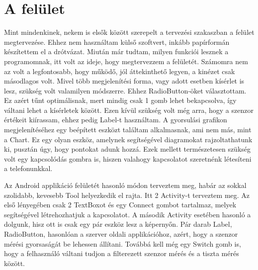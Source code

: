 \documentclass{thesis-ekf}
\theoremstyle{definition}
\theoremstyle{remark}
\begin{document}
\section{A felület}
Mint mindenkinek, nekem is elsők között szerepelt a tervezési szakaszban a felület megtervezése. Ehhez nem használtam külső szoftvert, inkább papírformán készítettem el a drótvázat. Miután már tudtam, milyen funkciói lesznek a programomnak, itt volt az ideje, hogy megtervezzem a felületét. Számomra nem az volt a legfontosabb, hogy működő, jól áttekinthető legyen, a kinézet csak másodlagos volt. Mivel több megjelenítési forma, vagy adott esetben kísérlet is lesz, szükség volt valamilyen módszerre. Ehhez RadioButton-öket választottam. Ez azért tűnt optimálisnak, mert mindig csak 1 gomb lehet bekapcsolva, így váltani lehet a kísérletek között. Ezen kívül szükség volt még arra, hogy a szenzor értékeit kiírassam, ehhez pedig Label-t használtam. A gyorsulási grafikon megjelenítéséhez egy beépített eszközt találtam alkalmasnak, ami nem más, mint a Chart. Ez egy olyan eszköz, amelynek segítségével diagramokat rajzoltathatunk ki, pusztán úgy, hogy pontokat adunk hozzá.
Ezek mellett természetesen szükség volt egy kapcsolódás gombra is, hiszen valahogy kapcsolatot szeretnénk létesíteni a telefonunkkal.
\par Az Android applikáció felületét hasonló módon terveztem meg, habár az sokkal szolidabb, kevesebb Tool helyezkedik el rajta. Itt 2 Activity-t terveztem meg. Az első lényegében csak 2 TextBoxot és egy Connect gombot tartalmaz, melyek segítségével létrehozhatjuk a kapcsolatot. A második Activity esetében hasonló a dolgunk, hisz ott is csak egy pár eszköz lesz a képernyőn. Pár darab Label, RadioButton, hasonlóan a szerver oldali applikációhoz, azért, hogy a szenzor mérési gyorsaságát be lehessen állítani. Továbbá kell még egy Switch gomb is, hogy a felhasználó váltani tudjon a filterezett szenzor mérés és a tiszta mérés között. 
\end{document}
